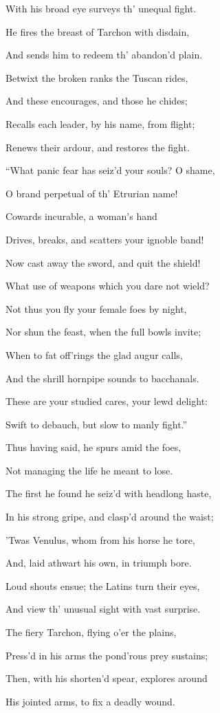 With his broad eye surveys th’ unequal fight.

He fires the breast of Tarchon with disdain,

And sends him to redeem th’ abandon’d plain.

Betwixt the broken ranks the Tuscan rides,

And these encourages, and those he chides;

Recalls each leader, by his name, from flight;

Renews their ardour, and restores the fight.

“What panic fear has seiz’d your souls? O shame,

O brand perpetual of th’ Etrurian name!

Cowards incurable, a woman’s hand

Drives, breaks, and scatters your ignoble band!

Now cast away the sword, and quit the shield!

What use of weapons which you dare not wield?

Not thus you fly your female foes by night,

Nor shun the feast, when the full bowls invite;

When to fat off’rings the glad augur calls,

And the shrill hornpipe sounds to bacchanals.

These are your studied cares, your lewd delight:

Swift to debauch, but slow to manly fight.”

Thus having said, he spurs amid the foes,

Not managing the life he meant to lose.

The first he found he seiz’d with headlong haste,

In his strong gripe, and clasp’d around the waist;

’Twas Venulus, whom from his horse he tore,

And, laid athwart his own, in triumph bore.

Loud shouts ensue; the Latins turn their eyes,

And view th’ unusual sight with vast surprise.

The fiery Tarchon, flying o’er the plains,

Press’d in his arms the pond’rous prey sustains;

Then, with his shorten’d spear, explores around

His jointed arms, to fix a deadly wound.

